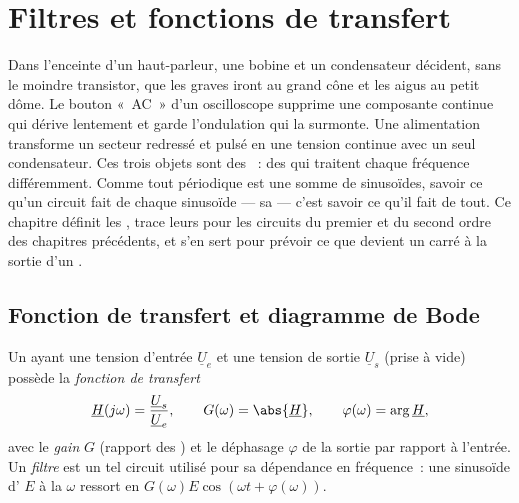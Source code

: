 \chapter{Filtres et fonctions de transfert}\label{ch:b1:filters-transfer-functions}

Dans l'enceinte d'un haut-parleur, une bobine et un condensateur
décident, sans le moindre transistor, que les graves iront au grand cône
et les aigus au petit dôme. Le bouton «~AC~» d'un oscilloscope supprime
une composante continue qui dérive lentement et garde l'ondulation qui
la surmonte. Une alimentation transforme un secteur redressé et pulsé en
une tension continue avec un seul condensateur. Ces trois objets sont
des \emph{}~: des  qui traitent chaque
fréquence différemment. Comme tout  périodique est une somme de
sinusoïdes, savoir ce qu'un circuit fait de chaque sinusoïde --- sa
 --- c'est savoir ce qu'il fait de tout. Ce chapitre
définit les , trace leurs  pour
les circuits du premier et du second ordre des chapitres précédents, et
s'en sert pour prévoir ce que devient un  carré à la sortie d'un
.

\section{Fonction de transfert et diagramme de Bode}

\begin{definition}\label{def:b1:filters-transfer-functions:H}
Un  ayant une tension d'entrée $\underline U_e$ et une
tension de sortie $\underline U_s$ (prise à vide) possède la
\emph{fonction de transfert}
\[
\underline H(j\omega) = \frac{\underline U_s}{\underline U_e},
\qquad G(\omega) = \abs{\underline H}, \qquad \varphi(\omega) = \arg\underline H,
\]
avec le \emph{gain} $G$ (rapport des ) et le déphasage
$\varphi$ de la sortie par rapport à l'entrée. Un \emph{filtre} est un
tel circuit utilisé pour sa dépendance en fréquence~: une sinusoïde
d' $E$ à la  $\omega$ ressort en
$G(\omega)E\cos(\omega t + \varphi(\omega))$.
\end{definition}

